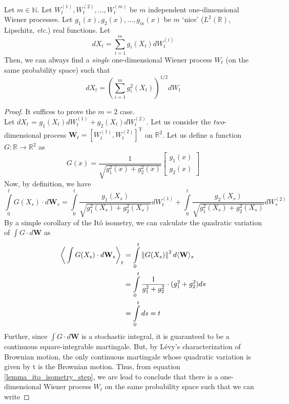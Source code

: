 \begin{lemma}
Let $m \in \mathbb{N}$. Let $W^{(1)}_t, W^{(2)}_t, \ldots, W^{(m)}_t$ be $m$ independent one-dimensional Wiener processes. Let $g_1(x), g_2(x), \ldots, g_m(x)$ be $m$ `nice' ($L^2(\mathbb{R})$, Lipschitz, \emph{etc}.) real functions. Let
\begin{equation*}
	dX_t = \sum\limits_{i=1}^{m} g_i(X_t)dW^{(i)}_t
\end{equation*}
Then, we can always find a \emph{single} one-dimensional Wiener process $W_t$ (on the same probability space) such that
\begin{equation*}
	dX_t = \left(\sum\limits_{i=1}^{m} g^2_i(X_t)\right)^{1/2}dW_t
\end{equation*}
\end{lemma}
\begin{proof}
It suffices to prove the $m=2$ case.\\
Let $dX_t$ = $g_1(X_t) dW^{(1)}_t + g_2(X_t)dW^{(2)}_t$. Let us consider the \emph{two}-dimensional process $\mathbf{W}_t = [W^{(1)}_t, W^{(2)}_t]^{\mathrm{T}}$ on $\mathbb{R}^2$. Let us define a function $G:\mathbb{R} \to \mathbb{R}^2$ as
\begin{equation}
\label{lemma_G_defn}
G(x) = \frac{1}{\sqrt{g_1^2(x) + g_2^2(x)}}\begin{bmatrix}g_1(x) \\ g_2(x)\end{bmatrix}
\end{equation}
Now, by definition, we have
\begin{equation}
	\label{lemma_G_integral}
\int\limits_{0}^{t}G(X_s) \cdot d\mathbf{W}_s = \int\limits_{0}^{t}\frac{g_1(X_s)}{\sqrt{g_1^2(X_s) + g_2^2(X_s)}} dW^{(1)}_t + \int\limits_{0}^{t}\frac{g_2(X_s)}{\sqrt{g_1^2(X_s) + g_2^2(X_s)}}dW^{(2)}_s
\end{equation}
By a simple corollary of the It\^o isometry, we can calculate the quadratic variation of $\int G \cdot d\mathbf{W}$ as
\begin{align}
\bigg\langle \int\limits G(X_s) \cdot d\mathbf{W}_s \bigg\rangle_t &= \int\limits_{0}^{t} \left\lVert G(X_s) \right\rVert^2 d \langle \mathbf{W} \rangle_s \nonumber\\
&= \int\limits_{0}^{t}  \frac{1}{g_1^2 + g_2^2} \cdot (g_1^2 + g_2^2) ds\nonumber\\
&= \int\limits_{0}^{t} ds  = t \label{lemma_ito_isometry_step}
\end{align}
Further, since $\int G \cdot d\mathbf{W}$ is a stochastic integral, it is guaranteed to be a continuous square-integrable martingale.  But, by L\'evy's characterization of Brownian motion, the only continuous martingale whose quadratic variation is given by t is the Brownian motion. Thus, from equation \eqref{lemma_ito_isometry_step}, we are lead to conclude that there is a one-dimensional Wiener process $W_t$ on the same probability space such that we can write

\end{proof}
